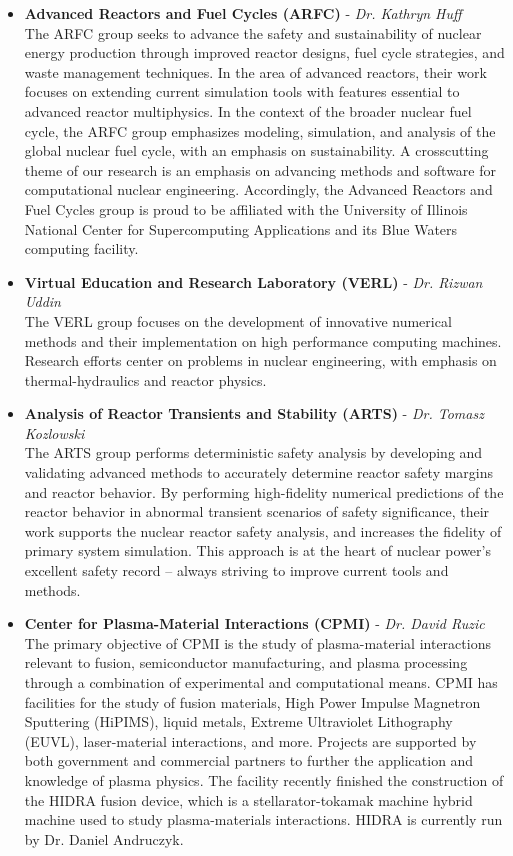 \begin{itemize}
  \item \textbf{Advanced Reactors and Fuel Cycles (ARFC)} - \textit{Dr. Kathryn Huff}\\
  The ARFC group seeks to advance the safety and sustainability of nuclear energy production through improved reactor designs, fuel cycle strategies, and waste management techniques. In the area of advanced reactors, their work focuses on extending current simulation tools with features essential to advanced reactor multiphysics. In the context of the broader nuclear fuel cycle, the ARFC group emphasizes modeling, simulation, and analysis of the global nuclear fuel cycle, with an emphasis on sustainability. A crosscutting theme of our research is an emphasis on advancing methods and software for computational nuclear engineering. Accordingly, the Advanced Reactors and Fuel Cycles group is proud to be affiliated with the University of Illinois National Center for Supercomputing Applications and its Blue Waters computing facility.
  \item \textbf{Virtual Education and Research Laboratory (VERL)} - \textit{Dr. Rizwan Uddin}\\
  The VERL group focuses on the development of innovative numerical methods and their implementation on high performance computing machines. Research efforts center on problems in nuclear engineering, with emphasis on thermal-hydraulics and reactor physics.

  \item \textbf{Analysis of Reactor Transients and Stability (ARTS)} - \textit{Dr. Tomasz Kozlowski}\\
  The ARTS group performs deterministic safety analysis by developing and validating advanced methods to accurately determine reactor safety margins and reactor behavior. By performing high-fidelity numerical predictions of the reactor behavior in abnormal transient scenarios of safety significance, their work supports the nuclear reactor safety analysis, and increases the fidelity of primary system simulation. This approach is at the heart of nuclear power’s excellent safety record – always striving to improve current tools and methods.

  \item \textbf{Center for Plasma-Material Interactions (CPMI)} - \textit{Dr. David Ruzic}\\
  The primary objective of CPMI is the study of plasma-material interactions relevant to fusion, semiconductor manufacturing, and plasma processing through a combination of experimental and computational means. CPMI has facilities for the study of fusion materials, High Power Impulse Magnetron Sputtering (HiPIMS), liquid metals, Extreme Ultraviolet Lithography (EUVL),  laser-material interactions, and more. Projects are supported by both government and commercial partners to further the application and knowledge of plasma physics. The facility recently finished the construction of the HIDRA fusion device, which is a stellarator-tokamak machine hybrid machine used to study plasma-materials interactions.  HIDRA is currently run by Dr. Daniel Andruczyk.


\end{itemize}
